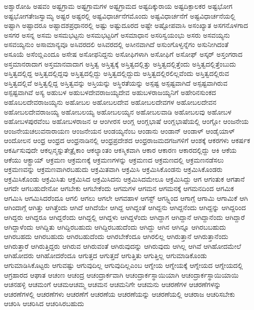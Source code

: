 {ಅಶ್ವಾರೋಹಿ
ಅಷವಂ
ಅಷ್ಟಗ್ರಾಮ
ಅಷ್ಟಗ್ರಾಮಗಳ
ಅಷ್ಟಗ್ರಾಮದ
ಅಷ್ಟದಿಕ್ಕುರಾಯ
ಅಷ್ಟದಿಕ್ಪಾಲಕರ
ಅಷ್ಟಭೋಗ
ಅಷ್ಟಭೋಗತೇಜಸ್ವಾಮ್ಯ
ಅಷ್ಟರ
ಅಷ್ಟರಲ್ಲಿ
ಅಷ್ಟವಿಧಾರ್ಚನೆಗಮೊಂದು
ಅಷ್ಟವಿಧಾರ್ಚನೆಗೆ
ಅಷ್ಟವಿಧಾರ್ಚನೆಯಲ್ಲಿ
ಅಷ್ಟಾಗಿ
ಅಷ್ಟಾದರೂ
ಅಷ್ಟಾದಶಪ್ರಧಾನರಲ್ಲಿ
ಅಷ್ಟು
ಅಷ್ಟುದೂರದ
ಅಷ್ಟೇ
ಅಷ್ಟೋಪವಾಸಿ
ಅಸಂಖ್ಯಾತ
ಅಸಗನೊಳಗಾದ
ಅಸಗರ
ಅಸನ್ನ
ಅಸಮ
ಅಸಮಭಟ್ಟನು
ಅಸಮಭಟ್ಟರಿಗೆ
ಅಸಮಾಧಾನ
ಅಸರಿಸ್ವಯಂಭು
ಅಸರು
ಅಸವಯ್ಯನು
ಅಸವಯ್ಯನುಂ
ಅಸಾಮಾನ್ಯವೂ
ಅಸಿವರದಲಿ
ಅಸಿವರದಲ್ಲಿ
ಅಸೀನವಾಗಿದೆ
ಅಸುಂಗೊಳ್ವನ್ನೆಗಂ
ಅಸುನೀಗಿದಂತೆ
ಅಸೂಯೆ
ಅಸೆಂಬ್ಲಿಎಂದೂ
ಅಸೇಷ
ಅಸೋಫನಿದ್ದನು
ಅಸೋಫಿಗಳಾಗಿ
ಅಸೋಫಿಗೆ
ಅಸೋಫ್
ಅಸ್ಕರ್
ಅಸ್ತಂಗರಾದ
ಅಸ್ತಮಾನರಾದಾಗ
ಅಸ್ತಮಾನವಾದಾಗ
ಅಸ್ತಿತ್ವ
ಅಸ್ತಿತ್ವಕ್ಕೆ
ಅಸ್ತಿತ್ವದಲ್ಲಿತ್ತು
ಅಸ್ತಿತ್ವದಲ್ಲಿತ್ತೆಂದು
ಅಸ್ತಿತ್ವದಲ್ಲಿತ್ತೆಂಬುದು
ಅಸ್ತಿತ್ವದಲ್ಲಿದ್ದ
ಅಸ್ತಿತ್ವದಲ್ಲಿದ್ದವು
ಅಸ್ತಿತ್ವದಲ್ಲಿದ್ದು
ಅಸ್ತಿತ್ವದಲ್ಲಿದ್ದುದು
ಅಸ್ತಿತ್ವದಲ್ಲಿರಲಿಲ್ಲವೆಂದು
ಅಸ್ತಿತ್ವದಲ್ಲಿರುವ
ಅಸ್ತಿತ್ವದಲ್ಲಿವೆ
ಅಸ್ತಿತ್ವಲ್ಲಿದ್ದ
ಅಸ್ತಿತ್ವವನ್ನು
ಅಸ್ತಿಯನ್ನು
ಅಸ್ಥಿರತೆಯನ್ನು
ಅಸ್ಪಷ್ಟ
ಅಸ್ಪಷ್ಟವಾಗಿದೆ
ಅಸ್ಪಷ್ಟವಾಗಿರುವ
ಅಸ್ಪಷ್ಟವಾಗಿವೆ
ಅಸ್ಯ
ಅಹುಬಳ
ಅಹುಬಳದೇವರಾಜಯ್ಯದೇವ
ಅಹುಬಳರಾಜಯ್ಯನಿಗೆ
ಅಹೇರಿನಸುಂಕದ
ಅಹೊಬಲದೇವರಾಜಯ್ಯನು
ಅಹೋಬಲ
ಅಹೋಬಲದೇವ
ಅಹೋಬಲದೇವಗಳ
ಅಹೋಬಲದೇವನ
ಅಹೋಬಲದೇವರಾಜಯ್ಯ
ಅಹೋಬಲಯ್ಯ
ಅಹೋಬಲಯ್ಯನ
ಅಹೋಬಲವಾಡಿ
ಅಹೋಬಲವು
ಅಹೋಬಳ
ಅಹೋಬಳಪುರವೆಂಬ
ಅಹೋಬಳರಾಜನ
ಆ
ಆಂಗೀರಸ
ಆಂಗ್ಲ
ಆಂಗ್ಲಭಾಷೆ
ಆಂಗ್ಲಭಾಷೆಯಲ್ಲಿ
ಆಂಗ್ಲೋ
ಆಂಜನೇಯ
ಆಂಜನೇಯಚಲುವನಾರಾಯಣ
ಆಂಜನೇಯನ
ಆಂಡಯ್ಯನೆಂಬ
ಆಂಡಾನು
ಆಂಡಾನ್
ಆಂಡಾಳ್
ಆಂಡೈಯಾಳ್
ಆಂದೋಲನ
ಆಂಧ್ರ
ಆಂಧ್ರದ
ಆಂಧ್ರನಾಡಿನಲ್ಲಿ
ಆಂಧ್ರಪ್ರದೇಶದ
ಆಂಧ್ರರಾಜಮದಗಜಗಳಿಗೆ
ಆಂಶಕ್ಕೆ
ಆಕರಗಳು
ಆಕರ್ಷಕ
ಆಕರ್ಷಿಸುವುದೇ
ಆಕಲ್ಪನ್ಮಸ್ನುತೇತ್ರೈಕಾಂ
ಆಕಲ್ಯಾಂತಂ
ಆಕಸ್ಮಿಕವಾಗಿ
ಆಕಾರ
ಆಕಾರಣ
ಆಕಾರದಲ್ಲಿದ್ದು
ಆಕಿ
ಆಕೆಯ
ಆಕೆಯು
ಆಕ್ಟ್ರಾಯ್
ಆಕ್ರಮಣ
ಆಕ್ರಮಣಕ್ಕೆ
ಆಕ್ರಮಣಗಳನ್ನು
ಆಕ್ರಮಣದ
ಆಕ್ರಮಣದಲ್ಲಿ
ಆಕ್ರಮಣನಡೆಸಲು
ಆಕ್ರಮಣವನ್ನು
ಆಕ್ರಮಣವಾಗಿರಬಹುದು
ಆಕ್ರಮಿತವಾಗಿ
ಆಕ್ರಮಿಸಿ
ಆಕ್ರಮಿಸಿಕೊಂಡನು
ಆಕ್ರಮಿಸಿಕೊಂಡರು
ಆಕ್ರಮಿಸಿಕೊಂಡು
ಆಕ್ರಮಿಸಿತು
ಆಕ್ರಮಿಸಿದ
ಆಕ್ರಮಿಸಿದನು
ಆಕ್ರಮಿಸಿದಮೇಲೂ
ಆಕ್ರಮಿಸಿದ್ದು
ಆಗ
ಆಗಂತುಕ
ಆಗತಾನೆ
ಆಗದೇ
ಆಗಬಹುದೇನೋ
ಆಗಬೇಕು
ಆಗಬೇಕೆಂದು
ಆಗಮಗಳ
ಆಗಮನ
ಆಗಮನಕ್ಕೆ
ಆಗಮನದಿಂದ
ಆಗಮಿಕ
ಆಗಮಿಸಿ
ಆಗಮಿಸಿದರೆಂದೂ
ಆಗಲಿ
ಆಗಲು
ಆಗಲೇ
ಆಗವಹಾಳ
ಆಗಸ್ಟ್
ಆಗಸ್ಟ್ನಿಂದ
ಆಗಾಗ್ಗೆ
ಆಗಾಮಿ
ಆಗಾಮಿಕೆ
ಆಗಿ
ಆಗಿಂದಾಗ್ಗೆ
ಆಗಿತ್ತು
ಆಗಿತ್ತೆಂದು
ಆಗಿದೆ
ಆಗಿದೆಯೇ
ಆಗಿದ್ದ
ಆಗಿದ್ದಂತೆ
ಆಗಿದ್ದನು
ಆಗಿದ್ದನೆಂದು
ಆಗಿದ್ದನ್ನು
ಆಗಿದ್ದರಿಂದ
ಆಗಿದ್ದರು
ಆಗಿದ್ದರೂ
ಆಗಿದ್ದರೆಂದು
ಆಗಿದ್ದಲ್ಲಿ
ಆಗಿದ್ದಳು
ಆಗಿದ್ದಳೆಂದು
ಆಗಿದ್ದಾಗ
ಆಗಿದ್ದಾನೆ
ಆಗಿದ್ದಾನೆಂದು
ಆಗಿದ್ದಾರೆ
ಆಗಿದ್ದಾಳೆಂದು
ಆಗಿದ್ದಿತು
ಆಗಿದ್ದಿರಬಹುದು
ಆಗಿದ್ದಿರಬಹುದೆಂದು
ಆಗಿದ್ದು
ಆಗಿನ
ಆಗಿನ್ನೂ
ಆಗಿರಬಬಹುದು
ಆಗಿರಬಹದು
ಆಗಿರಬಹುದು
ಆಗಿರಬಹುದೆಂದು
ಆಗಿರಬೇಕೆಂದೂ
ಆಗಿರಲಿಲ್ಲ
ಆಗಿರುತ್ತಾನೆ
ಆಗಿರುತ್ತಾನೆಂದು
ಆಗಿರುತ್ತಾರೆ
ಆಗಿರುತ್ತಿದ್ದರು
ಆಗಿರುವ
ಆಗಿರುವಂತೆ
ಆಗಿರುವುದನ್ನು
ಆಗಿರುವುದು
ಆಗಿಲ್ಲ
ಆಗಿವೆ
ಆಗಿಹೋದಮೇಲೆ
ಆಗಿಹೋದರು
ಆಗಿಹೋದರೆಂದೂ
ಆಗುತ್ತದ
ಆಗುತ್ತದೆ
ಆಗುತ್ತಿತು
ಆಗುತ್ತಿಲ್ಲ
ಆಗುಮಾಡಿಕೊಂಡು
ಆಗುಮಾಡಿಸಿಕೊಟ್ಟರು
ಆಗುವಷ್ಟು
ಆಗುವುದಿಲ್ಲ
ಆಗುವುದಿಲ್ಲಎಂಬ
ಆಗ್ನೇಯ
ಆಗ್ನೇಯಕ್ಕೆ
ಆಗ್ನೇಯದ
ಆಗ್ನೇಯದಲ್ಲಿ
ಆಗ್ರಹಾರದ
ಆಘಾತ
ಆಚಂಣ
ಆಚಂದ್ರ
ಆಚಂದ್ರಾರ್ಕವಾಗಿ
ಆಚಂದ್ರಾರ್ಕಸ್ಥಾಯಿಯಾಗಿ
ಆಚಂದ್ರಾರ್ಕಸ್ಥಾಯಿಯಾಯಿ
ಆಚನಹಳ್ಳಿ
ಆಚಮಂಗೆ
ಆಚಮಆಚಮ್ಮ
ಆಚಮನ
ಆಚಮನಿಗೇ
ಆಚಮನು
ಆಚರಣೆಗಳ
ಆಚರಣೆಗಳನ್ನು
ಆಚರಣೆಗಳಲ್ಲಿ
ಆಚರಣೆಗಳು
ಆಚರಣೆಗೆ
ಆಚರಣೆಯ
ಆಚರಣೆಯನ್ನು
ಆಚರಣೆಯಲ್ಲಿ
ಆಚರಾಜ
ಆಚರಿಸಬೇಕು
ಆಚರಿಸಿ
ಆಚರಿಸಿದ
ಆಚರಿಸಿರಬಹುದು
}
